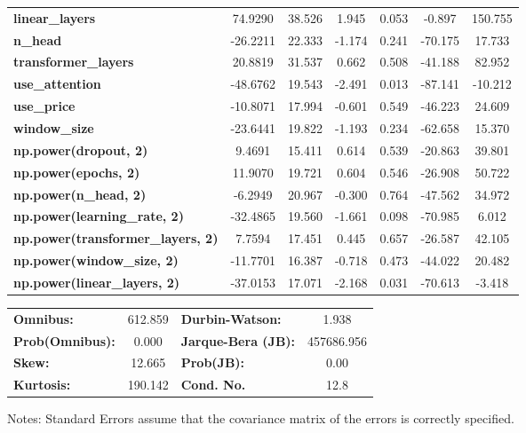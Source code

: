 \begin{center}
\begin{tabular}{lcccccc}
\textbf{linear\_layers}                   &      74.9290  &       38.526     &     1.945  &         0.053        &       -0.897    &      150.755     \\
\textbf{n\_head}                          &     -26.2211  &       22.333     &    -1.174  &         0.241        &      -70.175    &       17.733     \\
\textbf{transformer\_layers}              &      20.8819  &       31.537     &     0.662  &         0.508        &      -41.188    &       82.952     \\
\textbf{use\_attention}                   &     -48.6762  &       19.543     &    -2.491  &         0.013        &      -87.141    &      -10.212     \\
\textbf{use\_price}                       &     -10.8071  &       17.994     &    -0.601  &         0.549        &      -46.223    &       24.609     \\
\textbf{window\_size}                     &     -23.6441  &       19.822     &    -1.193  &         0.234        &      -62.658    &       15.370     \\
\textbf{np.power(dropout, 2)}             &       9.4691  &       15.411     &     0.614  &         0.539        &      -20.863    &       39.801     \\
\textbf{np.power(epochs, 2)}              &      11.9070  &       19.721     &     0.604  &         0.546        &      -26.908    &       50.722     \\
\textbf{np.power(n\_head, 2)}             &      -6.2949  &       20.967     &    -0.300  &         0.764        &      -47.562    &       34.972     \\
\textbf{np.power(learning\_rate, 2)}      &     -32.4865  &       19.560     &    -1.661  &         0.098        &      -70.985    &        6.012     \\
\textbf{np.power(transformer\_layers, 2)} &       7.7594  &       17.451     &     0.445  &         0.657        &      -26.587    &       42.105     \\
\textbf{np.power(window\_size, 2)}        &     -11.7701  &       16.387     &    -0.718  &         0.473        &      -44.022    &       20.482     \\
\textbf{np.power(linear\_layers, 2)}      &     -37.0153  &       17.071     &    -2.168  &         0.031        &      -70.613    &       -3.418     \\
\bottomrule
\end{tabular}
\begin{tabular}{lclc}
\textbf{Omnibus:}       & 612.859 & \textbf{  Durbin-Watson:     } &     1.938   \\
\textbf{Prob(Omnibus):} &   0.000 & \textbf{  Jarque-Bera (JB):  } & 457686.956  \\
\textbf{Skew:}          &  12.665 & \textbf{  Prob(JB):          } &      0.00   \\
\textbf{Kurtosis:}      & 190.142 & \textbf{  Cond. No.          } &      12.8   \\
\bottomrule
\end{tabular}
\end{center}

Notes: \newline
 [1] Standard Errors assume that the covariance matrix of the errors is correctly specified.